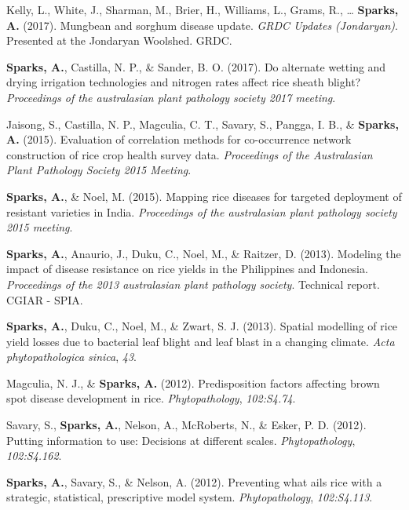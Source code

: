 \documentclass[11pt, a4paper]{awesome-cv}
\begin{document}
\leavevmode\hypertarget{ref-Kelly2017}{}%
Kelly, L., White, J., Sharman, M., Brier, H., Williams, L., Grams, R., \ldots{} \textbf{Sparks, A.} (2017). Mungbean and sorghum disease update. \emph{GRDC Updates (Jondaryan)}. Presented at the Jondaryan Woolshed. GRDC.

\leavevmode\hypertarget{ref-Sparks2017b}{}%
\textbf{Sparks, A.}, Castilla, N. P., \& Sander, B. O. (2017). Do alternate wetting and drying irrigation technologies and nitrogen rates affect rice sheath blight? \emph{Proceedings of the australasian plant pathology society 2017 meeting}.

\leavevmode\hypertarget{ref-Jaisong2015}{}%
Jaisong, S., Castilla, N. P., Magculia, C. T., Savary, S., Pangga, I. B., \& \textbf{Sparks, A.} (2015). Evaluation of correlation methods for co-occurrence network construction of rice crop health survey data. \emph{Proceedings of the Australasian Plant Pathology Society 2015 Meeting}.

\leavevmode\hypertarget{ref-Sparks2015}{}%
\textbf{Sparks, A.}, \& Noel, M. (2015). Mapping rice diseases for targeted deployment of resistant varieties in India. \emph{Proceedings of the australasian plant pathology society 2015 meeting}.

\leavevmode\hypertarget{ref-Sparks2013}{}%
\textbf{Sparks, A.}, Anaurio, J., Duku, C., Noel, M., \& Raitzer, D. (2013). Modeling the impact of disease resistance on rice yields in the Philippines and Indonesia. \emph{Proceedings of the 2013 australasian plant pathology society}. Technical report. CGIAR - SPIA.

\leavevmode\hypertarget{ref-Sparks2013a}{}%
\textbf{Sparks, A.}, Duku, C., Noel, M., \& Zwart, S. J. (2013). Spatial modelling of rice yield losses due to bacterial leaf blight and leaf blast in a changing climate. \emph{Acta phytopathologica sinica}, \emph{43}.

\leavevmode\hypertarget{ref-Magculia2012}{}%
Magculia, N. J., \& \textbf{Sparks, A.} (2012). Predisposition factors affecting brown spot disease development in rice. \emph{Phytopathology}, \emph{102:S4.74}.

\leavevmode\hypertarget{ref-Savary2012}{}%
Savary, S., \textbf{Sparks, A.}, Nelson, A., McRoberts, N., \& Esker, P. D. (2012). Putting information to use: Decisions at different scales. \emph{Phytopathology}, \emph{102:S4.162}.

\leavevmode\hypertarget{ref-Sparks2012}{}%
\textbf{Sparks, A.}, Savary, S., \& Nelson, A. (2012). Preventing what ails rice with a strategic, statistical, prescriptive model system. \emph{Phytopathology}, \emph{102:S4.113}.
\end{document}
